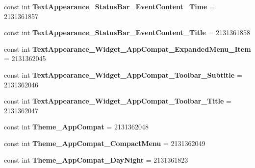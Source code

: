 \begin{DoxyCompactItemize}
\item 
\mbox{\label{classXaria_1_1Resource_1_1Style_a579f9d0540e066e8541b97f946197968}} 
const int {\bfseries Text\+Appearance\+\_\+\+Status\+Bar\+\_\+\+Event\+Content\+\_\+\+Time} = 2131361857
\item 
\mbox{\label{classXaria_1_1Resource_1_1Style_ab8032330e6c2406c6eeb55b7d9dc0854}} 
const int {\bfseries Text\+Appearance\+\_\+\+Status\+Bar\+\_\+\+Event\+Content\+\_\+\+Title} = 2131361858
\item 
\mbox{\label{classXaria_1_1Resource_1_1Style_a467e8740fde99db21f1a21edc1992d28}} 
const int {\bfseries Text\+Appearance\+\_\+\+Widget\+\_\+\+App\+Compat\+\_\+\+Expanded\+Menu\+\_\+\+Item} = 2131362045
\item 
\mbox{\label{classXaria_1_1Resource_1_1Style_aa9eeeabee9a93428d0f8fd33b919d540}} 
const int {\bfseries Text\+Appearance\+\_\+\+Widget\+\_\+\+App\+Compat\+\_\+\+Toolbar\+\_\+\+Subtitle} = 2131362046
\item 
\mbox{\label{classXaria_1_1Resource_1_1Style_a05a7e95ecab0ec5a7ae704ee37c5dedf}} 
const int {\bfseries Text\+Appearance\+\_\+\+Widget\+\_\+\+App\+Compat\+\_\+\+Toolbar\+\_\+\+Title} = 2131362047
\item 
\mbox{\label{classXaria_1_1Resource_1_1Style_a1cd33c2483e414c1b319bd1c913135f0}} 
const int {\bfseries Theme\+\_\+\+App\+Compat} = 2131362048
\item 
\mbox{\label{classXaria_1_1Resource_1_1Style_a70678ad5ef3b87d973972bb823a9ab51}} 
const int {\bfseries Theme\+\_\+\+App\+Compat\+\_\+\+Compact\+Menu} = 2131362049
\item 
\mbox{\label{classXaria_1_1Resource_1_1Style_a9c78bf02c956a1289c1bf79193f4c859}} 
const int {\bfseries Theme\+\_\+\+App\+Compat\+\_\+\+Day\+Night} = 2131361823
\item 
\mbox{\label{classXaria_1_1Resource_1_1Style_ad49692ba109d0ff3a9a0969c3cbf21f0}} 

\end{DoxyCompactItemize}
